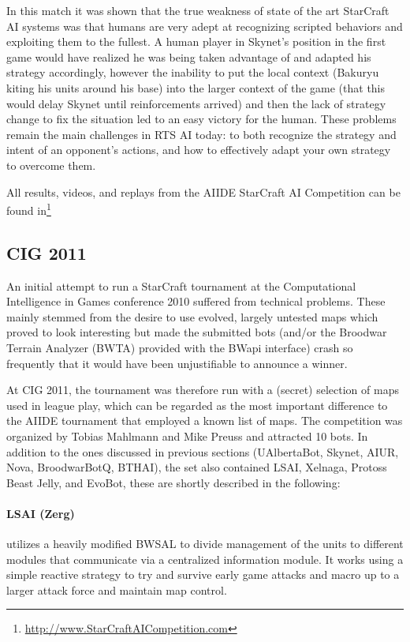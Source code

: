\documentclass[journal]{IEEEtran}
\begin{document}
In this match it was shown that the true weakness of state of the art StarCraft AI systems was that
humans are very adept at recognizing scripted behaviors and exploiting them to the fullest. A human
player in Skynet's position in the first game would have realized he was being taken advantage of and
adapted his strategy accordingly, however the inability to put the local context (Bakuryu kiting his
units around his base) into the larger context of the game (that this would delay Skynet until
reinforcements arrived) and then the lack of strategy change to fix the situation led to an easy
victory for the human. These problems remain the main challenges in RTS AI today: to both recognize
the strategy and intent of an opponent's actions, and how to effectively adapt your own strategy to 
overcome them.

All results, videos, and replays from the AIIDE StarCraft AI Competition can be found in\footnote{\url{http://www.StarCraftAICompetition.com}}



\subsection{CIG 2011}
\label{sec:cig2011}

An initial attempt to run a StarCraft tournament at the Computational
Intelligence in Games conference 2010 suffered from technical problems.
These mainly stemmed from the desire to use evolved, largely untested
maps which proved to look interesting but made the submitted bots 
(and/or the Broodwar Terrain Analyzer (BWTA) provided with the BWapi interface) crash
so frequently that it would have been unjustifiable to announce a winner.

At CIG 2011, the tournament was therefore run with a (secret) selection
of maps used in league play, which can be regarded as the most important
difference to the AIIDE tournament that employed a known list of maps.
The competition was organized by Tobias Mahlmann and Mike
Preuss and attracted 10 bots. In addition to the ones discussed in previous
sections (UAlbertaBot, Skynet, AIUR, Nova, BroodwarBotQ, BTHAI), 
the set also contained LSAI, Xelnaga, Protoss Beast Jelly, and EvoBot,
these are shortly described in the following:

\paragraph*{LSAI (Zerg)} utilizes a heavily modified BWSAL to divide management
 of the units to different modules that communicate via a centralized information
 module. It works using a simple reactive strategy to try and survive early game
 attacks and macro up to a larger attack force and maintain map control.
 
\end{document}
